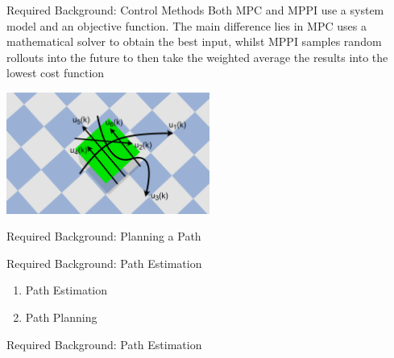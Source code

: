 \begin{frame}[fragile]{Required Background: Control Methods} %
  Both MPC and MPPI use a system model and an objective function. The main difference lies in 
  MPC uses a mathematical solver to obtain the best input, whilst MPPI samples random rollouts into the 
  future to then take the weighted average the results into the lowest cost function

  \begin{center}
  \includegraphics[width=0.5\textwidth]{figures/required_background/collect_io_data_object}
  \end{center}
\end{frame}

\begin{frame}[fragile]{Required Background: Planning a Path} %
\end{frame}

\begin{frame}[fragile]{Required Background: Path Estimation} %
\begin{block}{}
\begin{enumerate}
  \item Path Estimation\\\pause
  \item Path Planning\\
\end{enumerate}
\end{block}
\end{frame}


\begin{frame}[fragile]{Required Background: Path Estimation} %
\end{frame}

